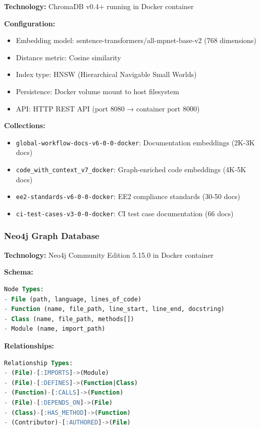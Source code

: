 \documentclass[11pt,letterpaper]{article}
\begin{document}
\textbf{Technology:} ChromaDB v0.4+ running in Docker container

\textbf{Configuration:}
\begin{itemize}
    \item Embedding model: sentence-transformers/all-mpnet-base-v2 (768 dimensions)
    \item Distance metric: Cosine similarity
    \item Index type: HNSW (Hierarchical Navigable Small Worlds)
    \item Persistence: Docker volume mount to host filesystem
    \item API: HTTP REST API (port 8080 → container port 8000)
\end{itemize}

\textbf{Collections:}
\begin{itemize}
    \item \texttt{global-workflow-docs-v6-0-0-docker}: Documentation embeddings (2K-3K docs)
    \item \texttt{code\_with\_context\_v7\_docker}: Graph-enriched code embeddings (4K-5K docs)
    \item \texttt{ee2-standards-v6-0-0-docker}: EE2 compliance standards (30-50 docs)
    \item \texttt{ci-test-cases-v3-0-0-docker}: CI test case documentation (66 docs)
\end{itemize}

\subsubsection{Neo4j Graph Database}

\textbf{Technology:} Neo4j Community Edition 5.15.0 in Docker container

\textbf{Schema:}
\begin{lstlisting}[language=SQL, caption=Neo4j node types]
Node Types:
- File (path, language, lines_of_code)
- Function (name, file_path, line_start, line_end, docstring)
- Class (name, file_path, methods[])
- Module (name, import_path)
\end{lstlisting}

\textbf{Relationships:}
\begin{lstlisting}[language=SQL, caption=Neo4j relationship types]
Relationship Types:
- (File)-[:IMPORTS]->(Module)
- (File)-[:DEFINES]->(Function|Class)
- (Function)-[:CALLS]->(Function)
- (File)-[:DEPENDS_ON]->(File)
- (Class)-[:HAS_METHOD]->(Function)
- (Contributor)-[:AUTHORED]->(File)
\end{lstlisting}
\end{document}
